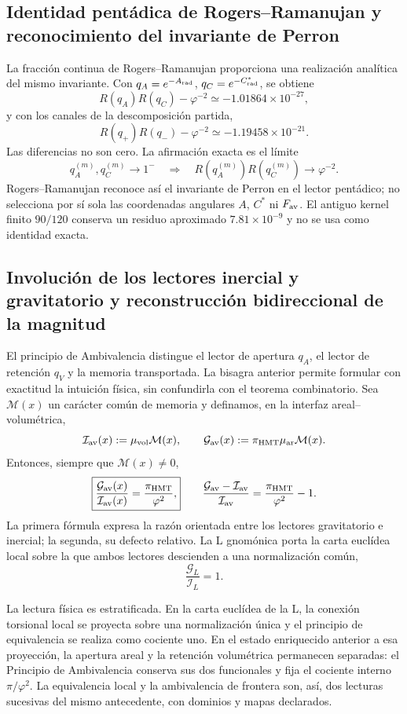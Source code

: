 \subsection{Identidad pentádica de Rogers--Ramanujan y reconocimiento del invariante de Perron}

La fracción continua de Rogers--Ramanujan proporciona una realización
analítica del mismo invariante. Con
\(q_A=e^{-A_{\rm rad}}\), \(q_C=e^{-C^*_{\rm rad}}\), se obtiene
\[
 R(q_A)R(q_C)-\varphi^{-2}\simeq-1.01864\times10^{-27},
\]
y con los canales de la descomposición partida,
\[
 R(q_+)R(q_-)-\varphi^{-2}\simeq-1.19458\times10^{-21}.
\]
Las diferencias no son cero. La afirmación exacta es el límite
\[
 q_A^{(m)},q_C^{(m)}\to1^-
 \quad\Longrightarrow\quad
 R(q_A^{(m)})R(q_C^{(m)})\to\varphi^{-2}.
\]
Rogers--Ramanujan reconoce así el invariante de Perron en el lector
pentádico; no selecciona por sí sola las coordenadas angulares \(A\), \(C^*\) ni
\(F_{\rm av}\). El antiguo kernel finito \(90/120\) conserva un residuo
aproximado \(7.81\times10^{-9}\) y no se usa como identidad exacta.

\subsection{Involución de los lectores inercial y gravitatorio y reconstrucción bidireccional de la magnitud}

El principio de Ambivalencia distingue el lector de apertura
\(q_A\), el lector de retención \(q_V\) y la memoria transportada. La
bisagra anterior permite formular con exactitud la intuición física, sin
confundirla con el teorema combinatorio. Sea \(\mathcal M(x)\) un carácter
común de memoria y definamos, en la interfaz areal--volumétrica,
\[
 \mathcal I_{\rm av}(x)
 :=\mu_{\rm vol}\mathcal M(x),
 \qquad
 \mathcal G_{\rm av}(x)
 :=\pi_{\rm HMT}\mu_{\rm ar}\mathcal M(x).
\]
Entonces, siempre que \(\mathcal M(x)\ne0\),
\[
 \boxed{
 \frac{\mathcal G_{\rm av}(x)}{\mathcal I_{\rm av}(x)}
 =\frac{\pi_{\rm HMT}}{\varphi^2},}
 \qquad
 \frac{\mathcal G_{\rm av}-\mathcal I_{\rm av}}
 {\mathcal I_{\rm av}}
 =\frac{\pi_{\rm HMT}}{\varphi^2}-1.
\]
La primera fórmula expresa la razón orientada entre los lectores
gravitatorio e inercial; la segunda, su defecto relativo. La L gnomónica
porta la carta euclídea local sobre la que ambos lectores descienden a una
normalización común,
\[
 \frac{\mathcal G_{L}}{\mathcal I_{L}}=1.
\]

La lectura física es estratificada. En la carta euclídea de la L, la
conexión torsional local se proyecta sobre una normalización única y el
principio de equivalencia se realiza como cociente uno. En el estado
enriquecido anterior a esa proyección, la apertura areal y la retención
volumétrica permanecen separadas: el Principio de Ambivalencia conserva sus
dos funcionales y fija el cociente interno \(\pi/\varphi^2\). La equivalencia
local y la ambivalencia de frontera son, así, dos lecturas sucesivas del
mismo antecedente, con dominios y mapas declarados.

